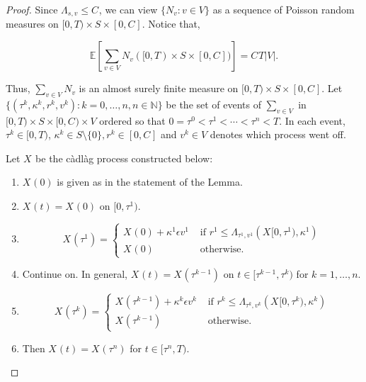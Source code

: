 \documentclass[12pt]{article}
\newcommand{\mb}{\mathbb}
\newcommand{\te}{\text}
\newcommand{\ep}{\epsilon}
\newcommand{\ind}{\hspace{24pt}}
\newcommand{\ex}[1]{\mb{E}\left[#1\right]}			%
\renewcommand{\v}{v}							%
\renewcommand{\S}{S}							%
\newcommand{\ev}{\ep}							%
\newcommand{\T}{T}								%
\renewcommand{\t}{t}							%
\newcommand{\poiss}[1]{N_{#1}}						%
\newcommand{\V}{V}									%
\renewcommand{\tt}{s}								%
\renewcommand{\r}{r}								%
\newcommand{\rt}[1]{\tau^{#1}}						%
\renewcommand{\it}{k}								%
\newcommand{\numb}{n}								%
\newcommand{\rxvt}[2]{X_{#1}{(#2)}}					%
\newcommand{\rxvts}[2]{X_{#1}{#2}}					%
\newcommand{\ratee}[1]{\Lambda_{#1}}				%
\newcommand{\const}[1]{C_{#1}}						%
\renewcommand{\mark}[1]{\kappa^{#1}}				%
\begin{document}
\begin{proof}
Since \(\ratee{\tt,\v} \leq \const{}\), we can view \(\{\poiss{\v}:\v\in\V\}\) as a sequence of Poisson random measures on \([0,\T)\times \S\times [0,\const{}]\). Notice that,

\[\ex{\sum_{\v\in\V}\poiss{\v}([0,\T)\times\S\times[0,\const{}])} = \const{}\T|\V|.\]

Thus, \(\sum_{\v\in\V}\poiss{\v}\) is an almost surely finite measure on \([0,\T)\times \S\times [0,\const{}]\). Let \(\{(\rt{\it},\mark{\it},\r^\it,\v^\it):\it = 0,\dots,\numb, \numb\in \mb{N}\}\) be the set of events of \(\sum_{\v\in\V}\) in \([0,\T)\times\S\times [0,\const{})\times \V\) ordered so that \(0=\rt{0} < \rt{1} < \cdots < \rt{\numb} < \T\). In each event, \(\rt{\it} \in [0,\T)\), \(\mark{\it}\in \S\setminus\{0\}, \r^\it \in [0,\const{}]\) and \(\v^\it \in \V\) denotes which process went off.

\ind Let \(\rxvts{}{}\) be the c\`adl\`ag process constructed below:

\begin{enumerate}
\item \(\rxvt{}{0}\) is given as in the statement of the Lemma.

\item \(\rxvt{}{\t} = \rxvt{}{0}\) on \([0,\rt{1})\).

\item 

\[\rxvt{}{\rt{1}} = \begin{cases}
\rxvt{}{0} + \mark{1}\ev{\v^1} &\te{ if } \r^1 \leq \ratee{\rt{1},\v^1}(\rxvts{}{[0,\rt{1})},\mark{1})\\
\rxvt{}{0} &\te{ otherwise.}
\end{cases}
\] 

\item Continue on. In general, \(\rxvt{}{\t} = \rxvt{}{\rt{\it-1}}\) on \(\t \in [\rt{\it-1},\rt{\it})\) for \(\it= 1,\dots,\numb\).

\item 

\[\rxvt{}{\rt{\it}} = \begin{cases}
\rxvt{}{\rt{\it-1}} + \mark{\it}\ev{\v^\it} &\te{ if } \r^\it \leq \ratee{\rt{\it},\v^\it}(\rxvts{}{[0,\rt{\it})},\mark{\it})\\
\rxvt{}{\rt{\it-1}} &\te{ otherwise.}
\end{cases}\]

\item Then \(\rxvt{}{\t} = \rxvt{}{\rt{\numb}}\) for \(\t\in [\rt{\numb},\T)\).
\end{enumerate}


\end{proof}
\end{document}
